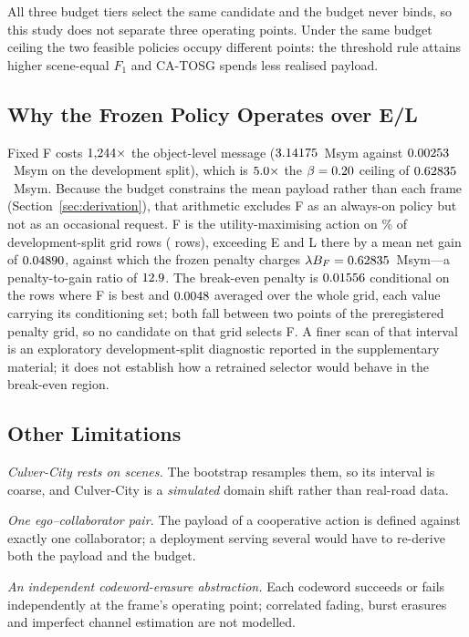 \documentclass[journal]{IEEEtran}
\newcommand{\method}{CA-TOSG}
\begin{document}
All three budget tiers select the same candidate and the budget never binds, so this study does not
separate three operating points. Under the same budget ceiling the two feasible policies occupy
different points: the threshold rule attains higher scene-equal $F_1$ and \method{} spends less
realised payload.

\subsection{Why the Frozen Policy Operates over E/L}
\label{sec:no_feature}
Fixed F costs $1{,}244\times$ the object-level message ($3.14175$~Msym against
$0.00253$~Msym on the development split), which is $5.0\times$ the
$\beta = 0.20$ ceiling of $0.62835$~Msym. Because the budget constrains the
mean payload rather than each frame (Section~\ref{sec:derivation}), that arithmetic excludes F as an
always-on policy but not as an occasional request. F is the utility-maximising action on
\FBestSharePct\% of development-split grid rows (\FBestRows{} rows), exceeding E and L there by a
mean net gain of $0.04890$, against which the frozen penalty charges
$\lambda B_F = 0.62835$~Msym---a penalty-to-gain ratio of $12.9$. The
break-even penalty is $0.01556$ conditional on the rows where F is best and $0.0048$
averaged over the whole grid, each value carrying its conditioning set; both fall between two points
of the preregistered penalty grid, so no candidate on that grid selects F. A finer scan of that
interval is an exploratory development-split diagnostic reported in the supplementary material; it
does not establish how a retrained selector would behave in the break-even region.

\subsection{Other Limitations}
\emph{Culver-City rests on \CulverScenes{} scenes.} The bootstrap resamples them, so its interval is
coarse, and Culver-City is a \emph{simulated} domain shift rather than real-road data.

\emph{One ego--collaborator pair.} The payload of a cooperative action is defined against exactly one
collaborator; a deployment serving several would have to re-derive both the payload and the budget.

\emph{An independent codeword-erasure abstraction.} Each codeword succeeds or fails independently
at the frame's operating point; correlated fading, burst erasures and imperfect channel estimation
are not modelled.
\end{document}
